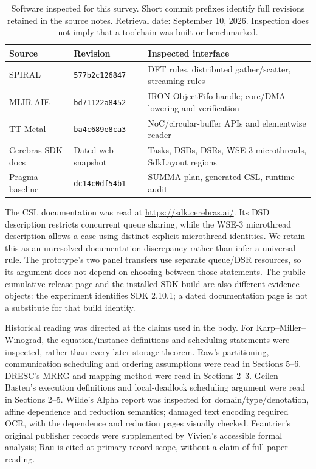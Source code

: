 \documentclass[final,3p,times,authoryear]{elsarticle}
\begin{document}
\begin{table}[ht]
\caption{Software inspected for this survey. Short commit prefixes identify full revisions retained in the source notes. Retrieval date: September 10, 2026. Inspection does not imply that a toolchain was built or benchmarked.}
\label{tab:versions}
\small
\begin{tabularx}{\linewidth}{@{}>{\raggedright\arraybackslash}p{2cm}>{\raggedright\arraybackslash}p{2.5cm}X@{}}
\toprule
Source & Revision & Inspected interface \\
\midrule
SPIRAL & \texttt{577b2c126847} & DFT rules, distributed gather/scatter, streaming rules \\
MLIR-AIE & \texttt{bd71122a8452} & IRON ObjectFifo handle; core/DMA lowering and verification \\
TT-Metal & \texttt{ba4c689e8ca3} & NoC/circular-buffer APIs and elementwise reader \\
Cerebras SDK docs & Dated web snapshot & Tasks, DSDs, DSRs, WSE-3 microthreads, SdkLayout regions \\
Pragma baseline & \texttt{dc14c0df54b1} & SUMMA plan, generated CSL, runtime audit \\
\bottomrule
\end{tabularx}
\end{table}

The CSL documentation was read at \url{https://sdk.cerebras.ai/}. Its DSD description restricts concurrent queue sharing, while the WSE-3 microthread description allows a case using distinct explicit microthread identities. We retain this as an unresolved documentation discrepancy rather than infer a universal rule. The prototype's two panel transfers use separate queue/DSR resources, so its argument does not depend on choosing between those statements. The public cumulative release page and the installed SDK build are also different evidence objects: the experiment identifies SDK 2.10.1; a dated documentation page is not a substitute for that build identity.

Historical reading was directed at the claims used in the body. For Karp--Miller--Winograd, the equation/instance definitions and scheduling statements were inspected, rather than every later storage theorem. Raw's partitioning, communication scheduling and ordering assumptions were read in Sections 5--6. DRESC's MRRG and mapping method were read in Sections 2--3. Geilen--Basten's execution definitions and local-deadlock scheduling argument were read in Sections 2--5. Wilde's Alpha report was inspected for domain/type/denotation, affine dependence and reduction semantics; damaged text encoding required OCR, with the dependence and reduction pages visually checked. Feautrier's original publisher records were supplemented by Vivien's accessible formal analysis; Rau is cited at primary-record scope, without a claim of full-paper reading.
\end{document}
